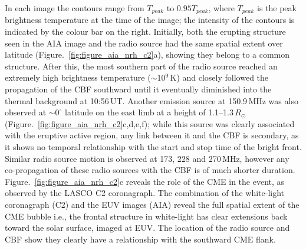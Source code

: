 In each image the contours range from $T_{peak}$ to $0.95T_{peak}$, where $T_{peak}$ is the peak brightness temperature at the time of the image; the intensity of the contours is indicated by the colour bar on the right. Initially, both the erupting structure seen in the AIA image and the radio source had the same spatial extent over latitude (Figure.~\ref{fig:figure_aia_nrh_c2}a), showing they belong to a common structure. After this, the most southern part of the radio source reached an extremely high brightness temperature ($\sim$10$^9$\,K) and closely followed the propagation of the CBF southward until it eventually diminished into the thermal background at 10:56\,UT. Another emission source at 150.9\,MHz was also observed at $\sim$$0^{\circ}$ latitude on the east limb at a height of 1.1--1.3$\,R_{\odot}$ (Figure.~\ref{fig:figure_aia_nrh_c2}c,d,e,f); while this source was clearly associated with the eruptive active region, any link between it and the CBF is secondary, as it shows no temporal relationship with the start and stop time of the bright front. Similar radio source motion is observed at 173, 228 and 270\,MHz, however any co-propagation of these radio sources with the CBF is of much shorter duration. Figure.~\ref{fig:figure_aia_nrh_c2}c 
reveals the role of the CME in the event, as observed by the LASCO C2 coronagraph. The combination of the white-light coronagraph (C2) and the EUV images (AIA) reveal the full spatial extent of the CME bubble i.e., the frontal structure in white-light has clear extensions back toward the solar surface, imaged at EUV. The location of the radio source and CBF show they clearly have a relationship with the southward CME flank.



